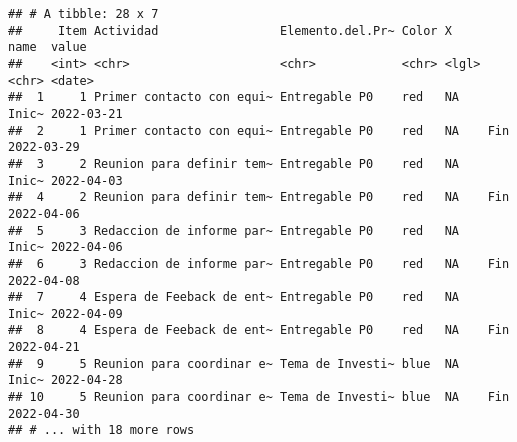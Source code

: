 \documentclass[
]{article}
\begin{document}
\begin{verbatim}
## # A tibble: 28 x 7
##     Item Actividad                 Elemento.del.Pr~ Color X     name  value     
##    <int> <chr>                     <chr>            <chr> <lgl> <chr> <date>    
##  1     1 Primer contacto con equi~ Entregable P0    red   NA    Inic~ 2022-03-21
##  2     1 Primer contacto con equi~ Entregable P0    red   NA    Fin   2022-03-29
##  3     2 Reunion para definir tem~ Entregable P0    red   NA    Inic~ 2022-04-03
##  4     2 Reunion para definir tem~ Entregable P0    red   NA    Fin   2022-04-06
##  5     3 Redaccion de informe par~ Entregable P0    red   NA    Inic~ 2022-04-06
##  6     3 Redaccion de informe par~ Entregable P0    red   NA    Fin   2022-04-08
##  7     4 Espera de Feeback de ent~ Entregable P0    red   NA    Inic~ 2022-04-09
##  8     4 Espera de Feeback de ent~ Entregable P0    red   NA    Fin   2022-04-21
##  9     5 Reunion para coordinar e~ Tema de Investi~ blue  NA    Inic~ 2022-04-28
## 10     5 Reunion para coordinar e~ Tema de Investi~ blue  NA    Fin   2022-04-30
## # ... with 18 more rows
\end{verbatim}
\end{document}
